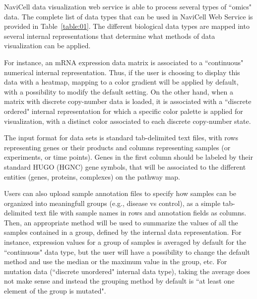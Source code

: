 \documentclass[a4,center,fleqn]{NAR}
\begin{document}
NaviCell data visualization web service is able to process
several types of ``omics" data. The complete list of data types that can be used in NaviCell Web Service
is provided in Table~\ref{table:01}. The different biological data
types are mapped into several internal representations that determine what methods
of data visualization can be applied.

For instance, an mRNA expression data matrix is associated to a
``continuous" numerical internal representation. Thus, if the user is choosing to display
this data with a heatmap, mapping to a color gradient will be applied by default, with a possibility
to modify the default setting. On the other hand, when a
matrix with discrete copy-number data is loaded, it is associated with a
``discrete ordered" internal representation for which
a specific color palette is applied for visualization,
with a distinct color associated to each discrete copy-number state.

The input format for data sets is standard tab-delimited text files, with rows
representing genes or their products and columns representing samples (or experiments, or time
points). Genes in the first column should be labeled by their standard HUGO (HGNC)
gene symbols, that will be associated to the different entities (genes,
proteins, complexes) on the pathway map.

Users can also upload sample annotation files to specify how samples can be organized into meaningfull groups
(e.g., disease vs control), as a simple tab-delimited text file with sample names in
rows and annotation fields as columns. Then, an appropriate method will be used
to summarize the values of all the samples contained in a group, defined by the
internal data representation. For instance, expression values for a group of samples
is averaged by default for the ``continuous" data type, but the user will have
a possibility to change the default method and use the median or
the maximum value in the group, etc. For mutation data (``discrete unordered" internal data type),
taking the average does not make sense and instead the grouping method by default is
``at least one element of the group is mutated".
\end{document}

